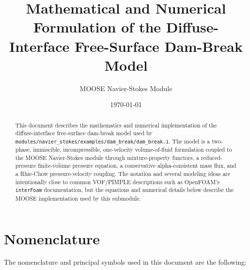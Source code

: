 \documentclass[11pt]{article}
\title{Mathematical and Numerical Formulation of the Diffuse-Interface Free-Surface Dam-Break Model}
\author{MOOSE Navier-Stokes Module}
\date{\today}
\begin{document}
\maketitle

\begin{abstract}
This document describes the mathematics and numerical implementation of the
diffuse-interface free-surface dam-break model used by
\texttt{modules/navier\_stokes/examples/dam\_break/dam\_break.i}.  The model is a two-phase,
immiscible, incompressible, one-velocity volume-of-fluid formulation coupled to
the MOOSE Navier-Stokes module through mixture-property functors, a
reduced-pressure finite-volume pressure equation, a conservative
alpha-consistent mass flux, and a Rhie-Chow pressure-velocity coupling.  The
notation and several modeling ideas are intentionally close to common
VOF/PIMPLE descriptions such as OpenFOAM's \texttt{interFoam} documentation,
but the equations and numerical details below describe the MOOSE
implementation used by this submodule.
\end{abstract}

\tableofcontents

\section{Nomenclature}

The nomenclature and principal symbols used in this document are the following:
\end{document}
